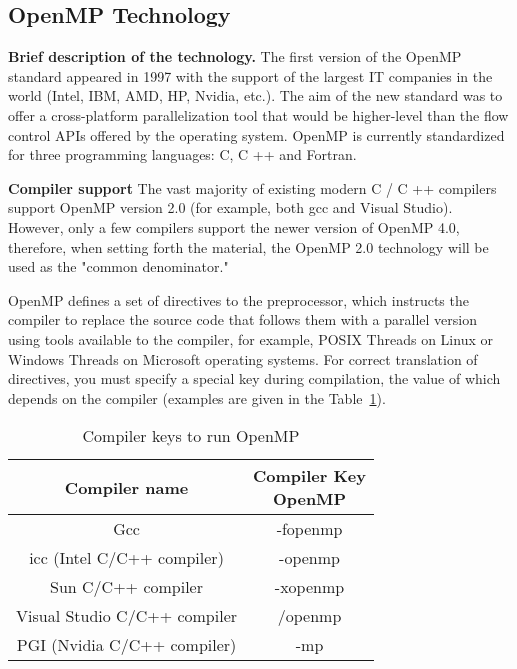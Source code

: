 { %
	\subsection{OpenMP Technology}
	\label{OpenMP:section}
	\par\textbf{Brief description of the technology.} The first version of the OpenMP standard appeared in 1997 with the support of the largest IT companies in the world (Intel, IBM, AMD, HP, Nvidia, etc.). The aim of the new standard was to offer a cross-platform parallelization tool that would be higher-level than the flow control APIs offered by the operating system. OpenMP is currently standardized for three programming languages: C, C ++ and Fortran.
	\par\textbf{Compiler support} The vast majority of existing modern C / C ++ compilers support OpenMP version 2.0 (for example, both gcc and Visual Studio). However, only a few compilers support the newer version of OpenMP 4.0, therefore, when setting forth the material, the OpenMP 2.0 technology will be used as the "common denominator."\
	\par OpenMP defines a set of directives to the preprocessor, which instructs the compiler to replace the source code that follows them with a parallel version using tools available to the compiler, for example, POSIX Threads on Linux or Windows Threads on Microsoft operating systems. For correct translation of directives, you must specify a special key during compilation, the value of which depends on the compiler (examples are given in the Table~\ref{compilerOpenMP:table}).
	\begin{table}[H]
		\caption{Compiler keys to run OpenMP}
		\label{compilerOpenMP:table}
		\begin{center}
			\begin{tabular}{|c|c|}
				\hline
				\textbf{Compiler name} & \specialcell{\textbf{Compiler Key} \\  \textbf{OpenMP}} \\
				\hline
				Gcc & -fopenmp \\
				\hline
				icc (Intel C/C++ compiler) & -openmp \\
				\hline
				Sun C/C++ compiler & -xopenmp \\
				\hline
				Visual Studio C/C++ compiler & /openmp \\
				\hline
				PGI (Nvidia C/C++ compiler) & -mp \\
				\hline
			\end{tabular}
		\end{center}

\end{table}}
